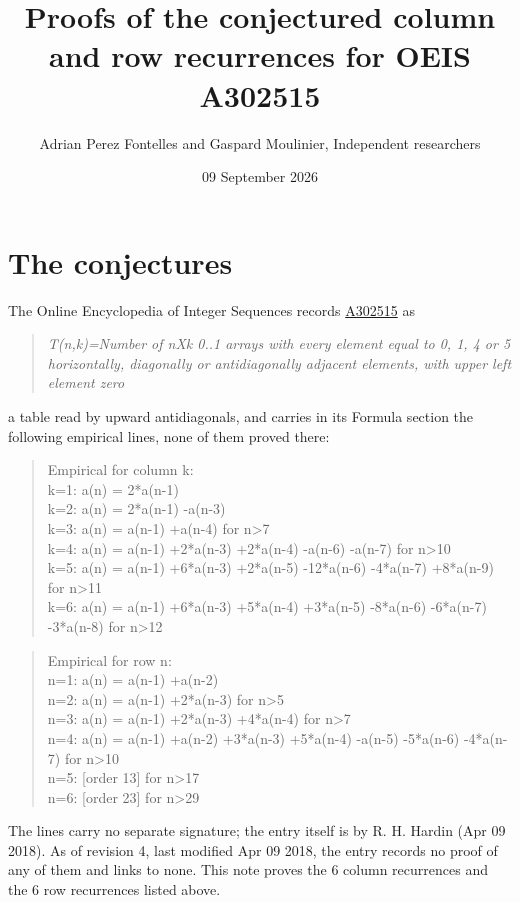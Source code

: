 \documentclass[11pt]{article}
\title{Proofs of the conjectured column and row recurrences for OEIS A302515}
\author{Adrian Perez Fontelles and Gaspard Moulinier, Independent researchers}
\date{09 September 2026}
\theoremstyle{definition}
\begin{document}
\maketitle
\section{The conjectures}

The Online Encyclopedia of Integer Sequences records \href{https://oeis.org/A302515}{A302515} as

\begin{quote}\itshape T(n,k)=Number of nXk 0..1 arrays with every element equal to 0, 1, 4 or 5 horizontally, diagonally or antidiagonally adjacent elements, with upper left element zero\end{quote}

a table read by upward antidiagonals, and carries in its Formula section the following empirical lines, none of them proved there:

\begin{quote}\ttfamily Empirical for column k:\\
k=1: a(n) = 2*a(n-1)\\k=2: a(n) = 2*a(n-1) -a(n-3)\\k=3: a(n) = a(n-1) +a(n-4) for n>7\\k=4: a(n) = a(n-1) +2*a(n-3) +2*a(n-4) -a(n-6) -a(n-7) for n>10\\k=5: a(n) = a(n-1) +6*a(n-3) +2*a(n-5) -12*a(n-6) -4*a(n-7) +8*a(n-9) for n>11\\k=6: a(n) = a(n-1) +6*a(n-3) +5*a(n-4) +3*a(n-5) -8*a(n-6) -6*a(n-7) -3*a(n-8) for n>12\end{quote}

\begin{quote}\ttfamily Empirical for row n:\\
n=1: a(n) = a(n-1) +a(n-2)\\n=2: a(n) = a(n-1) +2*a(n-3) for n>5\\n=3: a(n) = a(n-1) +2*a(n-3) +4*a(n-4) for n>7\\n=4: a(n) = a(n-1) +a(n-2) +3*a(n-3) +5*a(n-4) -a(n-5) -5*a(n-6) -4*a(n-7) for n>10\\n=5: [order 13] for n>17\\n=6: [order 23] for n>29\end{quote}

The lines carry no separate signature; the entry itself is by R. H. Hardin (Apr 09 2018). As of revision 4, last modified Apr 09 2018, the entry records no proof of any of them and links to none. This note proves the 6 column recurrences and the 6 row recurrences listed above.
\end{document}
